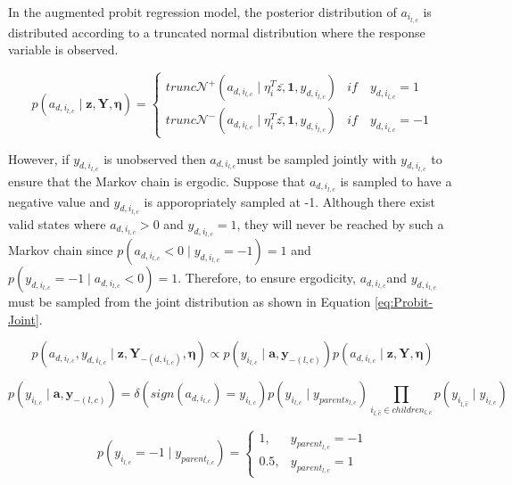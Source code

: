 \documentclass{article}
\begin{document}
In the augmented probit regression model, the posterior distribution
of $a_{i_{l,c}}$ is distributed according to a truncated normal distribution
where the response variable is observed.

\begin{equation}
p\left(a_{d,i_{l,c}}\mid\mathbf{z},\mathbf{Y},\mathbf{\eta}\right)=\begin{cases}
trunc\mathcal{N}^{+}\left(a_{d,i_{l,c}}\mid\eta_{i}^{T}\bar{z,}\mathbf{1},y_{d,i_{l,c}}\right) & if\quad y_{d,i_{l,c}}=1\\
trunc\mathcal{N}^{-}\left(a_{d,i_{l,c}}\mid\eta_{i}^{T}\bar{z,}\mathbf{1},y_{d,i_{l,c}}\right) & if\quad y_{d,i_{l,c}}=-1\end{cases}\end{equation}


However, if $y_{d,i_{l,c}}$ is unobserved then $a_{d,i_{l,c}}$must
be sampled jointly with $y_{d,i_{l,c}}$ to ensure that the Markov
chain is ergodic. Suppose that $a_{d,i_{l,c}}$ is sampled to have
a negative value and $y_{d,i_{l,c}}$ is apporopriately sampled at
-1. Although there exist valid states where $a_{d,i_{l,c}}>0$ and
$y_{d,i_{l,c}}=1$, they will never be reached by such a Markov chain
since $p\left(a_{d,i_{l,c}}<0\mid y_{d,i_{l,c}}=-1\right)=1$ and
$p\left(y_{d,i_{l,c}}=-1\mid a_{d,i_{l,c}}<0\right)=1$. Therefore,
to ensure ergodicity, $a_{d,i_{l,c}}$and $y_{d,i_{l,c}}$ must be
sampled from the joint distribution as shown in Equation \ref{eq:Probit-Joint}.

\begin{equation}
p\left(a_{d,i_{l,c}},y_{d,i_{l,c}}\mid\mathbf{z},\mathbf{Y}_{-\left(d,i_{l,c}\right)},\mathbf{\eta}\right)\propto p\left(y_{i_{l,c}}\mid\mathbf{a},\mathbf{y}_{-\left(l,c\right)}\right)p\left(a_{d,i_{l,c}}\mid\mathbf{z},\mathbf{Y},\mathbf{\eta}\right)\end{equation}


\begin{equation}
p\left(y_{i_{l,c}}\mid\mathbf{a},\mathbf{y}_{-\left(l,c\right)}\right)=\delta\left(sign\left(a_{d,i_{l,c}}\right)=y_{i_{l,c}}\right)p\left(y_{i_{l,c}}\mid y_{parents_{l,c}}\right)\prod_{i_{\hat{l},\hat{c}}\in children_{l,c}}p\left(y_{i_{\hat{l},\hat{c}}}\mid y_{i_{l,c}}\right)\end{equation}


\begin{equation}
p\left(y_{i_{l,c}}=-1\mid y_{parent{}_{l,c}}\right)=\begin{cases}
1, & y_{parent_{l,c}}=-1\\
0.5, & y_{parent_{l,c}}=1\end{cases}\end{equation}
\end{document}
